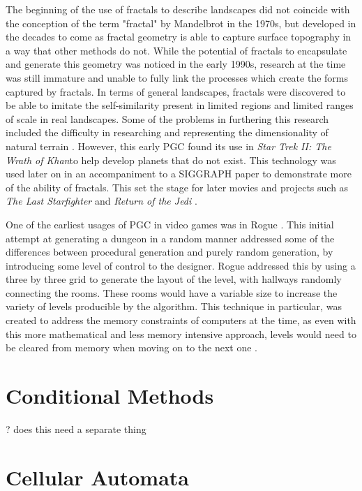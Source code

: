 \documentclass[10pt]{report}
\begin{document}
		The beginning of the use of fractals to describe landscapes did not coincide with the conception of the term "fractal" by Mandelbrot in the 1970s, but developed in the decades to come as fractal geometry is able to capture surface topography in a way that other methods do not. While the potential of fractals to encapsulate and generate this geometry was noticed in the early 1990s, research at the time was still immature and unable to fully link the processes which create the forms captured by fractals. In terms of general landscapes, fractals were discovered to be able to imitate the self-similarity present in limited regions and limited ranges of scale in real landscapes. Some of the problems in furthering this research included the difficulty in researching and representing the dimensionality of natural terrain \cite{XU1993245}. However, this early PGC found its use in \emph{Star Trek II: The Wrath of Khan}to help develop planets that do not exist. This technology was used later on in an accompaniment to a SIGGRAPH paper to demonstrate more of the ability of fractals. This set the stage for later movies and projects such as \emph{The Last Starfighter} and \emph{Return of the Jedi} \cite{ibm-fractal}. 
		
		One of the earliest usages of PGC in video games was in Rogue \cite{rogue}. This initial attempt at generating a dungeon in a random manner addressed some of the differences between procedural generation and purely random generation, by introducing some level of control to the designer. Rogue addressed this by using a three by three grid to generate the layout of the level, with hallways randomly connecting the rooms. These rooms would have a variable size to increase the variety of levels producible by the algorithm. This technique in particular, was created to address the memory constraints of computers at the time, as even with this more mathematical and less memory intensive approach, levels would need to be cleared from memory when moving on to the next one \cite{rogue}.
		
	\vspace{10pt}
	\let\clearpage\relax
	\chapter{Conditional Methods}
	? does this need a separate thing
		
	\vspace{10pt}
	\let\clearpage\relax
	\chapter{Cellular Automata}
		
\end{document}
